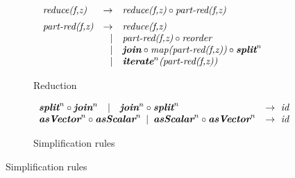 \begin{figure}[t]
\vspace{\ruleSpace}
\begin{subfigure}[b]{1\linewidth}
\begin{mdframed}
\vspace{-.5em}
$$
\begin{array}{lrl}
\pat{reduce(f,z)} & \rightarrow & \pat{reduce(f,z)} \circ \pat{part-red(f,z)}\\[.5em]
\pat{part-red(f,z)} & \rightarrow & \pat{reduce(f,z)}\\                                                      
  &| & \pat{part-red(f,z)} \circ \pat{reorder}\\    
  &| & \pat{\textbf{join}} \circ \pat{map(part-red(f,z))} \circ \pat{\textbf{split}}^n\\
  &| & \pat{\textbf{iterate}}^{n}\pat{(part-red(f,z))}\\
\end{array}
%
$$
\end{mdframed}
  \caption{Reduction}
  \label{fig:algo:red}
\end{subfigure}


\vspace{\ruleSpace}
\begin{subfigure}[b]{1\linewidth}
\begin{mdframed}
\vspace{-.5em}
$$
\begin{array}{lr}
\textit{\textbf{split}}^n \circ \textit{\textbf{join}}^n \hspace{1em} |\hspace{1em} \textit{\textbf{join}}^n \circ \textit{\textbf{split}}^n & \rightarrow \ \textit{id}\\
\textit{\textbf{asVector}}^n \circ \textit{\textbf{asScalar}}^n \hspace{.5em} |\hspace{.5em} \textit{\textbf{asScalar}}^n \circ \textit{\textbf{asVector}}^n       & \rightarrow \ \textit{id}\\
\end{array}
$$
\end{mdframed}
  \caption{Simplification rules}
   \label{fig:algo:simpl}
\end{subfigure}


\end{figure}
